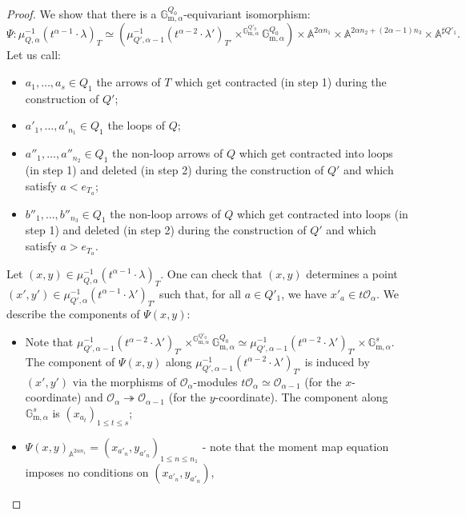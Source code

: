 \documentclass[11pt,english]{article}
\numberwithin{equation}{section}
\numberwithin{figure}{section}
\theoremstyle{definition}
\theoremstyle{plain}
\theoremstyle{remark}
\begin{document}
\begin{proof}

We show that there is a $\mathbb{G}_{\mathrm{m},\alpha}^{Q_{0}}$-equivariant
isomorphism:\[
\Psi:
\mu_{Q,\alpha}^{-1}(t^{\alpha-1}\cdot\lambda)_T
\simeq
\left(
\mu_{Q',\alpha-1}^{-1}(t^{\alpha-2}\cdot\lambda')_{T'}
\times^{\mathbb{G}_{\mathrm{m},\alpha}^{Q'_0}}\mathbb{G}_{\mathrm{m},\alpha}^{Q_0}
\right)
\times\mathbb{A}^{2\alpha n_1}\times\mathbb{A}^{2\alpha n_2+(2\alpha-1)n_3}\times\mathbb{A}^{\sharp Q'_1}.
\] Let us call:
\begin{itemize}
\item $a_{1},\ldots,a_{s}\in Q_{1}$ the arrows of $T$ which get contracted
(in step 1) during the construction of $Q'$;
\item $a'_{1},\ldots,a'_{n_{1}}\in Q_{1}$ the loops of $Q$;
\item $a''_{1},\ldots,a''_{n_{2}}\in Q_{1}$ the non-loop arrows of $Q$
which get contracted into loops (in step 1) and deleted (in step 2)
during the construction of $Q'$ and which satisfy $a<e_{T_{a}}$;
\item $b''_{1},\ldots,b''_{n_{3}}\in Q_{1}$ the non-loop arrows of $Q$
which get contracted into loops (in step 1) and deleted (in step 2)
during the construction of $Q'$ and which satisfy $a>e_{T_{a}}$.
\end{itemize}
Let $(x,y)\in\mu_{Q,\alpha}^{-1}(t^{\alpha-1}\cdot\lambda)_{T}$.
One can check that $(x,y)$ determines a point $(x',y')\in\mu_{Q',\alpha}^{-1}(t^{\alpha-1}\cdot\lambda')_{T'}$
such that, for all $a\in Q'_{1}$, we have $x'_{a}\in t\mathcal{O}_{\alpha}$.
We describe the components of $\Psi(x,y)$:
\begin{itemize}
\item Note that $\mu_{Q',\alpha-1}^{-1}(t^{\alpha-2}\cdot\lambda')_{T'}\times^{\mathbb{G}_{\mathrm{m},\alpha}^{Q'_{0}}}\mathbb{G}_{\mathrm{m},\alpha}^{Q_{0}}\simeq\mu_{Q',\alpha-1}^{-1}(t^{\alpha-2}\cdot\lambda')_{T'}\times\mathbb{G}_{\mathrm{m},\alpha}^{s}$.
The component of $\Psi(x,y)$ along $\mu_{Q',\alpha-1}^{-1}(t^{\alpha-2}\cdot\lambda')_{T'}$
is induced by $(x',y')$ via the morphisms of $\mathcal{O}_{\alpha}$-modules
$t\mathcal{O}_{\alpha}\simeq\mathcal{O}_{\alpha-1}$ (for the $x$-coordinate)
and $\mathcal{O}_{\alpha}\twoheadrightarrow\mathcal{O}_{\alpha-1}$
(for the $y$-coordinate). The component along $\mathbb{G}_{\mathrm{m},\alpha}^{s}$
is $(x_{a_{t}})_{1\leq t\leq s}$;
\item $\Psi(x,y)_{\mathbb{A}^{2\alpha n_{1}}}=(x_{a'_{n}},y_{a'_{n}})_{1\leq n\leq n_{1}}$
- note that the moment map equation imposes no conditions on $(x_{a'_{n}},y_{a'_{n}})$,

\end{itemize}
\end{proof}
\end{document}
